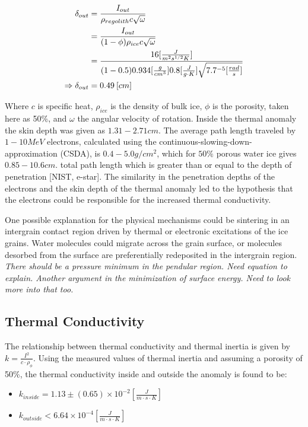 \documentclass[11pt]{article} %
\begin{document}
	\begin{equation}
	\begin{split}
	\delta_{out} &= \frac{I_{out}}{\rho_{regolith} c \sqrt{\omega}}  \\
		&= \frac{I_{out}}{(1-\phi)\rho_ {ice} c \sqrt{\omega}} \\
		&= \frac{16  [ \frac{J}{m^{2} s^{1/2} K} ]}{(1-0.5)0.934 [\frac{g}{cm^{3}}] 0.8 [\frac{J}{g \cdot K}] \sqrt{7.7\time10^{-5} [\frac{rad}{s}]}} \\
	\Rightarrow \delta_{out}&= 0.49\: [cm]
	\end{split}
	\end{equation}

	Where $c$ is specific heat, $\rho_{ice}$ is the density of bulk ice, $\phi$ is the porosity, taken here as 50\%, and $\omega$ the angular velocity of rotation. Inside the thermal anomaly the skin depth was given as $1.31-2.71 cm$. The average path length traveled by $1 - 10 MeV$ electrons, calculated using the continuous-slowing-down-approximation (CSDA), is $0.4-5.0 g/cm^{2}$, which for $50\%$ porous water ice gives $0.85-10.6 cm$.  total path length which is greater than or equal to the depth of penetration [NIST, e-star]. The similarity in the penetration depths of the electrons and the skin depth of the thermal anomaly led to the hypothesis that the electrons could be responsible for the increased thermal conductivity.  
	
	One possible explanation for the physical mechanisms could be sintering in an intergrain contact region driven by thermal or electronic excitations of the ice grains. Water molecules could migrate across the grain surface, or molecules desorbed from the surface are preferentially redeposited in the intergrain region. \emph{There should be a pressure minimum in the pendular region. Need equation to explain. Another argument in the minimization of surface energy. Need to look more into that too.}

\subsection{Thermal Conductivity}

	The relationship between thermal conductivity and thermal inertia is given by $k = \frac{I^{2}}{c \cdot \rho_{\phi}}$. Using the measured values of thermal inertia and assuming a porosity of 50\%, the thermal conductivity inside and outside the anomaly is found to be:
	
	\begin{itemize}
	\item $k_{inside} = 1.13 \pm(0.65) \times 10^{-2} [\frac{J}{m \cdot s \cdot K}]$
	\item $k_{outside} < 6.64 \times 10^{-4} [\frac{J}{m \cdot s \cdot K}]$
	\end{itemize}
	
\end{document}

